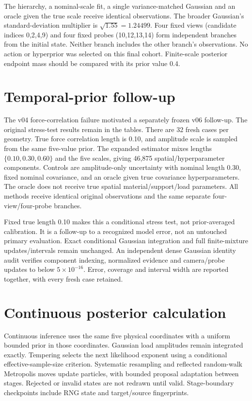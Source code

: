 \documentclass[10pt,twocolumn,letterpaper]{article}
\begin{document}
The hierarchy, a nominal-scale fit, a single variance-matched Gaussian and an oracle given the true scale receive identical observations. The broader Gaussian's standard-deviation multiplier is $\sqrt{1.55}=1.24499$. Four fixed views (candidate indices 0,2,4,9) and four fixed probes (10,12,13,14) form independent branches from the initial state. Neither branch includes the other branch's observations. No action or hyperprior was selected on this final cohort. Finite-scale posterior endpoint mass should be compared with its prior value 0.4.





\section{Temporal-prior follow-up}
The v04 force-correlation failure motivated a separately frozen v06 follow-up. The original stress-test results remain in the tables. There are 32 fresh cases per geometry. True force correlation length is 0.10, and amplitude scale is sampled from the same five-value prior. The expanded estimator mixes lengths $\{0.10,0.30,0.60\}$ and the five scales, giving 46,875 spatial/hyperparameter components. Controls are amplitude-only uncertainty with nominal length 0.30, fixed nominal covariance, and an oracle given true covariance hyperparameters. The oracle does not receive true spatial material/support/load parameters. All methods receive identical original observations and the same separate four-view/four-probe branches.

Fixed true length 0.10 makes this a conditional stress test, not prior-averaged calibration. It is a follow-up to a recognized model error, not an untouched primary evaluation. Exact conditional Gaussian integration and full finite-mixture updates/intervals remain unchanged. An independent dense Gaussian identity audit verifies component indexing, normalized evidence and camera/probe updates to below $5\times10^{-16}$. Error, coverage and interval width are reported together, with every fresh case retained.


\section{Continuous posterior calculation}
Continuous inference uses the same five physical coordinates with a uniform bounded prior in those coordinates. Gaussian load amplitudes remain integrated exactly. Tempering selects the next likelihood exponent using a conditional effective-sample-size criterion. Systematic resampling and reflected random-walk Metropolis moves update particles, with bounded proposal adaptation between stages. Rejected or invalid states are not redrawn until valid. Stage-boundary checkpoints include RNG state and target/source fingerprints.
\end{document}
